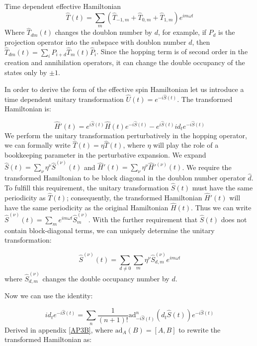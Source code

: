 \begin{section}{Time dependent effective Hamiltonian}
\begin{equation}
\hat{T}(t) = \sum_m (\hat{T}_{-1,m}+\hat{T}_{0,m}+\hat{T}_{1,m})e^{im\omega t}
\end{equation}
Where $\hat{T}_{dm}(t)$ changes the doublon number by $d$, for example, if $\hat{P}_d$ is the projection operator into the subspace with doublon number $d$, then $\hat{T}_{dm}(t) = \sum_i \hat{P}_{i+d}\hat{T}_{m}(t)\hat{P}_i$. Since the hopping term is of second order in the creation and annihilation operators, it can change the double occupancy of the states only by $\pm1$.

In order to derive the form of the effective spin Hamiltonian let us introduce a time dependent unitary transformation $\hat{U}(t) = e^{-i\hat{S}(t)}$. The transformed Hamiltonian is:

\begin{equation}
\hat{H}'(t) = e^{i\hat{S}(t)} \hat{H}(t) e^{-i\hat{S}(t)} - e^{i\hat{S}(t)} id_t e^{-i\hat{S}(t)}
\end{equation} 
We perform the unitary transformation perturbatively in the hopping operator, we can formally write $\hat{T}(t) = \eta \hat{T}(t)$, where $\eta$ will play the role of a bookkeeping parameter in the perturbative expansion. We expand $\hat{S}(t) = \sum_\nu \eta^\nu \hat{S}^{(\nu)}(t)$ and $\hat{H}'(t) = \sum_\nu \eta^\nu \hat{H}'^{(\nu)}(t)$. We require the transformed Hamiltonian to be block diagonal in the doublon number operator $\hat{d}$. To fulfill this requirement, the unitary transformation $\hat{S}(t)$ must have the same periodicity as $\hat{T}(t)$; consequently, the transformed Hamiltonian $\hat{H}'(t)$ will have the same periodicity as the original Hamiltonian $\hat{H}(t)$. Thus we can write $\hat{S}^{(\nu)}(t) = \sum_m e^{im\omega t}\hat{S}^{(\nu)}_m$. With the further requirement that $\hat{S}(t)$ does not contain block-diagonal terms, we can uniquely determine the unitary transformation:

\begin{equation}
\hat{S}^{(\nu)}(t) = \sum_{d \neq 0} \sum_m \eta^\nu \hat{S}^{(\nu)}_{d,m} e^{im\omega t}
\end{equation}
where $\hat{S}^{(\nu)}_{d,m}$ changes the double occupancy number by $d$.

Now we can use the identity:

\begin{equation}
id_t e^{-i\hat{S}(t)} = \sum_n \frac{1}{(n+1)!}\text{ad}_{-i\hat{S}(t)}^n (d_t \hat{S}(t))e^{-i\hat{S}(t)}
\end{equation}
Derived in appendix \ref{AP3B}, where $\text{ad}_A(B) = [A,B]$ to rewrite the transformed Hamiltonian as:


\end{section}
